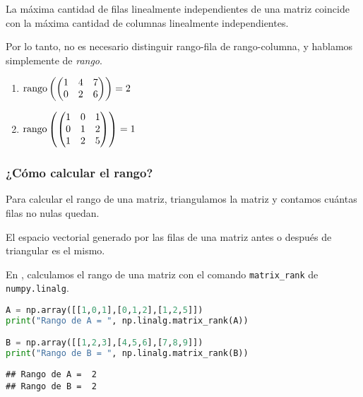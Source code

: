 \begin{prop} La máxima cantidad de filas linealmente independientes de una matriz coincide con la máxima cantidad de columnas linealmente independientes.
\end{prop}

Por lo tanto, no es necesario distinguir rango-fila de rango-columna, y hablamos simplemente de \emph{rango}.

\begin{ejemplo}\leavevmode
\begin{enumerate}
\item $\operatorname{rango}\left(\begin{pmatrix}1&4&7\\0&2&6\end{pmatrix}\right) = 2$
\item $\operatorname{rango}\left(\begin{pmatrix}1&0&1 \\ 0&1&2 \\ 1 & 2 & 5\end{pmatrix}\right) = 1$
\end{enumerate}
\end{ejemplo}

\subsubsection{¿Cómo calcular el rango?}

Para calcular el rango de una matriz, triangulamos la matriz y contamos cuántas filas no nulas quedan.

\begin{prop}
El espacio vectorial generado por las filas de una matriz antes o después de triangular es el mismo.
\end{prop}

En \python, calculamos el rango de una matriz con el comando \texttt{matrix\_rank} de \texttt{numpy.linalg}.

\begin{Shaded}
\begin{lstlisting}[language=Python]
A = np.array([[1,0,1],[0,1,2],[1,2,5]])
print("Rango de A = ", np.linalg.matrix_rank(A))

B = np.array([[1,2,3],[4,5,6],[7,8,9]])
print("Rango de B = ", np.linalg.matrix_rank(B))
\end{lstlisting}
\end{Shaded}

\begin{verbatim}
## Rango de A =  2
## Rango de B =  2
\end{verbatim}

